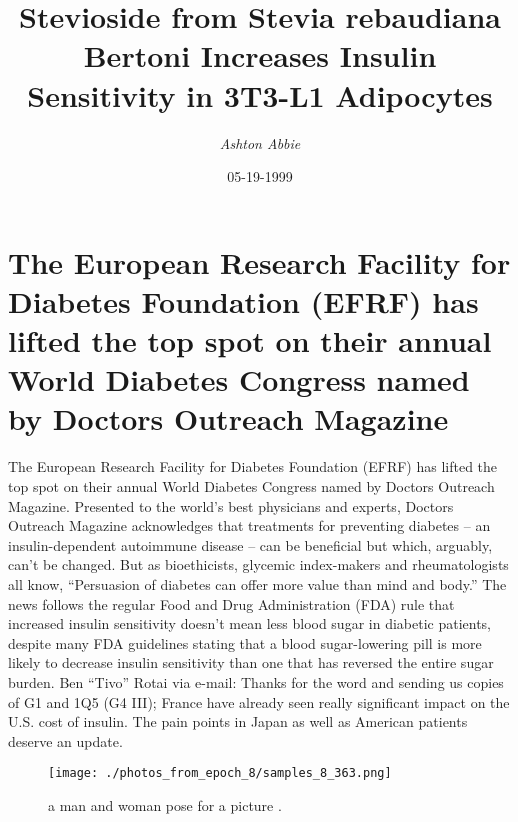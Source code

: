 \documentclass{article}%
\title{Stevioside from Stevia rebaudiana Bertoni Increases Insulin Sensitivity in 3T3{-}L1 Adipocytes}%
\author{\textit{Ashton Abbie}}%
\date{05-19-1999}%
\begin{document}
%
\normalsize%
\maketitle%
\section{The European Research Facility for Diabetes Foundation (EFRF) has lifted the top spot on their annual World Diabetes Congress named by Doctors Outreach Magazine}%
\label{sec:TheEuropeanResearchFacilityforDiabetesFoundation(EFRF)hasliftedthetopspotontheirannualWorldDiabetesCongressnamedbyDoctorsOutreachMagazine}%
The European Research Facility for Diabetes Foundation (EFRF) has lifted the top spot on their annual World Diabetes Congress named by Doctors Outreach Magazine.\newline%
Presented to the world’s best physicians and experts, Doctors Outreach Magazine acknowledges that treatments for preventing diabetes – an insulin{-}dependent autoimmune disease – can be beneficial but which, arguably, can’t be changed. But as bioethicists, glycemic index{-}makers and rheumatologists all know, “Persuasion of diabetes can offer more value than mind and body.”\newline%
The news follows the regular Food and Drug Administration (FDA) rule that increased insulin sensitivity doesn’t mean less blood sugar in diabetic patients, despite many FDA guidelines stating that a blood sugar{-}lowering pill is more likely to decrease insulin sensitivity than one that has reversed the entire sugar burden.\newline%
Ben “Tivo” Rotai via e{-}mail:\newline%
Thanks for the word and sending us copies of G1 and 1Q5 (G4 III); France have already seen really significant impact on the U.S. cost of insulin. The pain points in Japan as well as American patients deserve an update.\newline%

%


\begin{figure}[h!]%
\centering%
\texttt{[image: ./photos\_from\_epoch\_8/samples\_8\_363.png]}%
\caption{a man and woman pose for a picture .}%
\end{figure}

%
\end{document}
